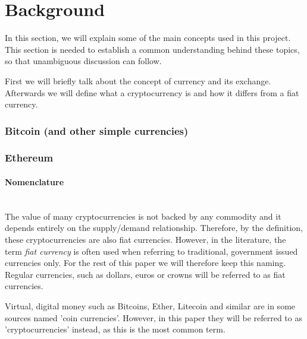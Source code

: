 \section{Background}
% 
In this section, we will explain some of the main concepts used in this project. This section is needed to establish a common understanding behind these topics, so that unambiguous discussion can follow.

First we will briefly talk about the concept of currency and its exchange. Afterwards we will define what a cryptocurrency is and how it differs from a fiat currency. 
% 

% 

% 

% 










\subsubsection{Bitcoin (and other simple currencies)}
\subsubsection{Ethereum}

\paragraph{Nomenclature}\hfill\\
% 
The value of many cryptocurrencies is not backed by any commodity and it depends entirely on the supply/demand relationship. Therefore, by the definition, these cryptocurrencies are also fiat currencies. However, in the literature, the term \emph{fiat currency} is often used when referring to traditional, government issued currencies only. For the rest of this paper we will therefore keep this naming. Regular currencies, such as dollars, euros or crowns will be referred to as fiat currencies.

Virtual, digital money such as Bitcoins, Ether, Litecoin and similar are in some sources named 'coin currencies'. However, in this paper they will be referred to as 'cryptocurrencies' instead, as this is the most common term.